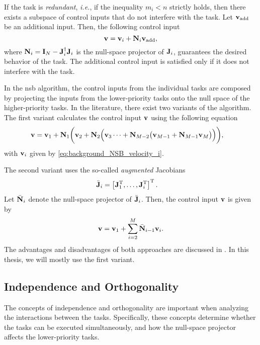 If the task is \emph{redundant}, \emph{i.e.}, if the inequality $m_i < n$ strictly holds, then there exists a subspace of control inputs that do not interfere with the task.
Let $\mathbf{v}_{\rm add}$ be an additional input.
Then, the following control input
\begin{equation}
    \mathbf{v} = \mathbf{v}_i + \mathbf{N}_i \mathbf{v}_{\rm add},
\end{equation}
where $\mathbf{N}_i = \mathbf{I}_{N} - \mathbf{J}_i^{\dagger}\mathbf{J}_i$ is the null-space projector of $\mathbf{J}_i$, guarantees the desired behavior of the task.
The additional control input is satisfied only if it does not interfere with the task.

In the \gls{nsb} algorithm, the control inputs from the individual tasks are composed by projecting the inputs from the lower-priority tasks onto the null space of the higher-priority tasks.
In the literature, there exist two variants of the algorithm.
The first variant calculates the control input $\mathbf{v}$ using the following equation
\begin{align}
    \mathbf{v} &= \mathbf{v}_{1} + \mathbf{N}_1 \biggl(\mathbf{v}_{2} + \mathbf{N}_2\Bigl(\mathbf{v}_3 \cdots + \mathbf{N}_{M-2}\bigl(\mathbf{v}_{M-1} + \mathbf{N}_{M-1}\mathbf{v}_M\bigr)\Bigr)\biggr),
    \label{eq:background_NSB_recursive}
\end{align}
with $\mathbf{v}_{i}$ given by \eqref{eq:background_NSB_velocity_i}.

The second variant uses the so-called \emph{augmented} Jacobians
\begin{align}
    \Bar{\mathbf{J}}_i &= \left[\mathbf{J}_1^{\mathrm{T}}, \ldots, \mathbf{J}_i^{\mathrm{T}}\right]^{\mathrm{T}}.
    \label{eq:background_NSB_augmented}
\end{align}
Let $\Bar{\mathbf{N}}_i$ denote the null-space projector of $\Bar{\mathbf{J}}_i$.
Then, the control input $\mathbf{v}$ is given by
\begin{equation}
    \mathbf{v} = \mathbf{v}_1 + \sum_{i=2}^M \Bar{\mathbf{N}}_{i-1} \mathbf{v}_i.
\end{equation}
The advantages and disadvantages of both approaches are discussed in \cite{antonelli_stability_2008}.
In this thesis, we will mostly use the first variant.

\subsection{Independence and Orthogonality}
\label{sec:background_NSB_independence}
The concepts of independence and orthogonality are important when analyzing the interactions between the tasks.
Specifically, these concepts determine whether the tasks can be executed simultaneously, and how the null-space projector affects the lower-priority tasks.

